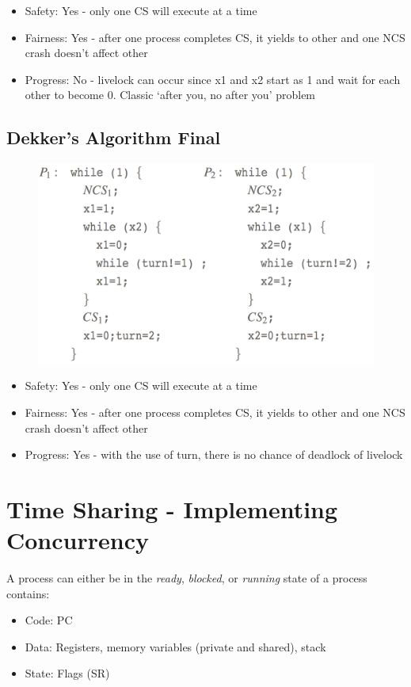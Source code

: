 \documentclass{hw}
\begin{document}
\begin{itemize}
  \item Safety:    Yes - only one CS will execute at a time                 
  \item Fairness:  Yes - after one process completes CS, it yields to other and
    one NCS crash doesn't affect other
  \item Progress:  No - livelock can occur since x1 and x2 start as 1 and wait
    for each other to become 0. Classic `after you, no after you' problem                
\end{itemize}

\subsection{Dekker's Algorithm Final}
\begin{figure}[H]
  \centering
  \includegraphics[scale=.4]{dekker3}
\end{figure}
                                                                        
\begin{itemize}
  \item Safety:    Yes - only one CS will execute at a time                 
  \item Fairness:  Yes - after one process completes CS, it yields to other and
    one NCS crash doesn't affect other 
  \item Progress:  Yes - with the use of turn, there is no chance of deadlock of livelock       
\end{itemize}


\section{Time Sharing - Implementing Concurrency}
A process can either be in the \emph{ready}, \emph{blocked}, or \emph{running}
state of a process contains:
\begin{itemize}
  \item Code: PC
  \item Data: Registers, memory variables (private and shared), stack
  \item State: Flags (SR) 
\end{itemize}
\end{document}
